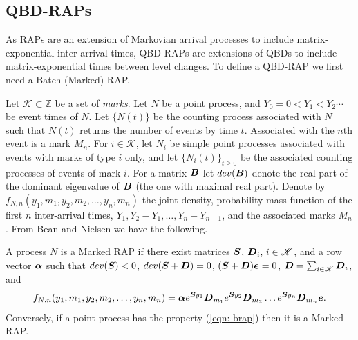 %
%

\subsection{QBD-RAPs}
As RAPs are an extension of Markovian arrival processes to include matrix-exponential inter-arrival times, QBD-RAPs are extensions of QBDs to include matrix-exponential times between level changes. To define a QBD-RAP we first need a Batch (Marked) RAP. 

Let \(\mathscr K\subset \mathbb Z\) be a set of \emph{marks}. Let \(N\) be a point process, and \(Y_0=0<Y_1<Y_2\cdots\) be event times of \(N\). Let \(\{N(t)\}\) be the counting process associated with \(N\) such that \(N(t)\) returns the number of events by time \(t\). Associated with the \(n\)th event is a mark \(M_n\). For \(i\in\mathscr K\), let \(N_i\) be simple point processes associated with events with marks of type \(i\) only, and let \(\{N_i(t)\}_{t\geq 0}\) be the associated counting processes of events of mark \(i\). For a matrix \(\boldsymbol B\) let \(dev(\boldsymbol B)\) denote the real part of the dominant eigenvalue of \(\boldsymbol B\) (the one with maximal real part). Denote by \(f_{N,n}(y_1,m_1,y_2,m_2,\dots,y_n,m_n)\) the joint density, probability mass function of the first \(n\) inter-arrival times, \(Y_1,Y_2-Y_1,\dots,Y_n-Y_{n-1}\), and the associated marks \(M_n\). From Bean and Nielsen \cite[Theorem 1]{bn2010} we have the following. 
\begin{thm}
A process \(N\) is a Marked RAP if there exist matrices \(\boldsymbol S\), \(\boldsymbol D_i,\,i\in\mathscr K\), and a row vector \(\boldsymbol \alpha\) such that \(dev(\boldsymbol S)<0\), \(dev(\boldsymbol S+\boldsymbol D)=0\), \((\boldsymbol S+\boldsymbol D)\boldsymbol e = 0\), \(\boldsymbol D = \sum_{i\in\mathscr K} \boldsymbol D_i\), and 
\begin{align}f_{N,n}(y_1,m_1,y_2,m_2,\dots,y_n,m_n) = \boldsymbol \alpha e^{\boldsymbol S y_1}\boldsymbol D_{m_1} e^{\boldsymbol S y_2} \boldsymbol D_{m_2}\dots e^{\boldsymbol S y_n} \boldsymbol D_{m_n}\boldsymbol e.\label{eqn: brap}\end{align}
Conversely, if a point process has the property (\ref{eqn: brap}) then it is a Marked RAP.
\end{thm}

